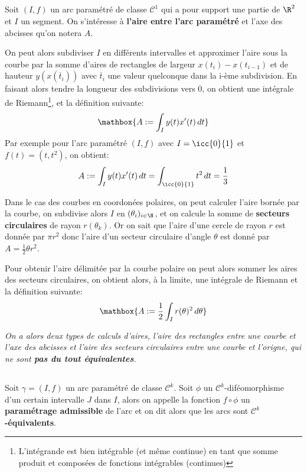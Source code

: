 \pagebreak
\subsection*{}
Soit \((I, f)\) un arc paramétré de classe \(\mathcal{C}^1\) qui a pour support une partie de \(\R^2\) et \(I\) un segment. On s'intéresse à \textbf{l'aire entre l'arc paramétré} et l'axe des abcisses qu'on notera \(A\).\<

On peut alors subdiviser \(I\) en différents intervalles et approximer l'aire sous la courbe par la somme d'aires de rectangles de largeur \(x(t_i)-x(t_{i-1})\) et de hauteur \(y(x(\overline{t}_i))\) avec \(\overline{t}_i\) une valeur quelconque dans la i-ème subdivision. En faisant alors tendre la longueur des subdivisions vers 0, on obtient une intégrale de Riemann\footnote[1]{\label{note1}L'intégrande est bien intégrable (et même continue) en tant que somme produit et composées de fonctions intégrables (continues)}, et la définition suivante:
\[
   \mathbox{A := \int_I y(t)x'(t)\, dt}  
\]
Par exemple pour l'arc paramétré \((I, f)\) avec \(I = \icc{0}{1}\) et \(f(t) = (t, t^2)\), on obtient:
\[
   A := \int_I y(t)x'(t)\, dt = \int_{\icc{0}{1}} t^2\, dt = \frac{1}{3}
\]

Dans le cas des courbes en coordonées polaires, on peut calculer l'aire bornée par la courbe, on subdivise alors \(I\) en \((\theta_i)_{i \in \N}\), et on calcule la somme de \textbf{secteurs circulaires} de rayon \(r(\theta_k)\). Or on sait que l'aire d'une cercle de rayon \(r\) est donnée par \(\pi r^2\) donc l'aire d'un secteur circulaire d'angle \(\theta\) est donné par \(A = \frac{1}{2}\theta r^2\).\<

Pour obtenir l'aire délimitée par la courbe polaire on peut alors sommer les aires des secteurs circulaires, on obtient alors, à la limite, une intégrale de Riemann et la définition suivante:
\[
   \mathbox{A := \frac{1}{2} \int_I r(\theta)^2\, d\theta}  
\]
\begin{center}
   \textit{
      On a alors deux types de calculs d'aires, l'aire des rectangles entre une courbe et l'axe des abcisses et l'aire des secteurs circulaires entre une courbe et l'origne, qui ne sont \textbf{pas du tout équivalentes}.
   }
\end{center}

\subsection*{}
Soit \(\gamma = (I, f)\) un arc paramétré de classe \(\mathcal{C}^k\). Soit \(\phi\) un \(\mathcal{C}^k\)-diféomorphisme d'un certain intervalle \(J\) dans \(I\), alors on appelle la fonction \(f \circ \phi\) un \textbf{paramétrage admissible} de l'arc et on dit alors que les arcs sont \(\mathcal{C}^k\)\textbf{-équivalents}.\<

